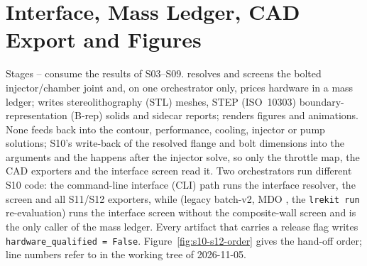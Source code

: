 \chapter{Interface, Mass Ledger, CAD Export and Figures}\label{ch:s10-s12}


Stages -- consume the results of S03--S09.  resolves and screens the bolted injector/chamber joint and, on one orchestrator only, prices hardware in a mass ledger;  writes stereolithography (STL) meshes, STEP (ISO~10303) boundary-representation (B-rep) solids and sidecar reports;  renders figures and animations. None feeds back into the contour, performance, cooling, injector or pump solutions; S10's write-back of the resolved flange and bolt dimensions into the arguments and the  happens after the injector solve, so only the throttle map, the CAD exporters and the interface screen read it. Two orchestrators run different S10 code: the command-line interface (CLI) path  runs the interface resolver, the screen and all S11/S12 exporters, while  (legacy  batch-v2, MDO , the \texttt{lrekit run} re-evaluation) runs the interface screen without the composite-wall screen and is the only caller of the mass ledger. Every artifact that carries a release flag writes \texttt{hardware\_qualified = False}. Figure~\ref{fig:s10-s12-order} gives the hand-off order; line numbers refer to  in the working tree of 2026-11-05.


